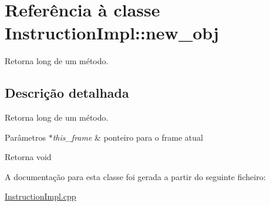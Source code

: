 \hypertarget{class_instruction_impl_1_1new__obj}{}\section{Referência à classe Instruction\+Impl\+:\+:new\+\_\+obj}
\label{class_instruction_impl_1_1new__obj}


Retorna long de um método.  




\subsection{Descrição detalhada}
Retorna long de um método. 


\begin{DoxyParams}{Parâmetros}
{\em $\ast$this\+\_\+frame} & ponteiro para o frame atual \\
\hline
\end{DoxyParams}
\begin{DoxyReturn}{Retorna}
void 
\end{DoxyReturn}


A documentação para esta classe foi gerada a partir do seguinte ficheiro\+:\begin{DoxyCompactItemize}
\item 
\hyperlink{_instruction_impl_8cpp}{Instruction\+Impl.\+cpp}\end{DoxyCompactItemize}
